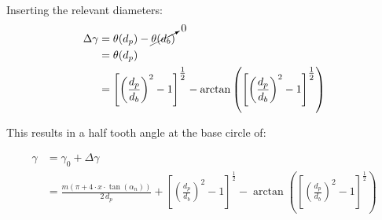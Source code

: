 Inserting the relevant diameters:
\begin{subequations}
\begin{align}
\Delta \gamma &= \theta(d_p) - \cancelto{0}{\theta(d_b)} \\
    &= \theta(d_p) \\
    &= \left[\left(\frac{d_p}{d_b}\right)^2 - 1\right]^{\tfrac{1}{2}}
        - \arctan\left(\left[\left(\frac{d_p}{d_b}\right)^2 - 1\right]^{\tfrac{1}{2}}\right)
\end{align}
\end{subequations}

This results in a half tooth angle at the base circle of:

\begin{subequations}
\begin{align}
    \gamma &= \gamma_0+\Delta \gamma \\
           &= \frac{m\left(\pi + 4 \cdot x \cdot \tan(\alpha_n)\right)}{2\,d_p} + \left[\left(\frac{d_p}{d_b}\right)^2 - 1\right]^{\tfrac{1}{2}} - \arctan\left(\left[\left(\frac{d_p}{d_b}\right)^2 - 1\right]^{\tfrac{1}{2}}\right)
\end{align}
\end{subequations}

